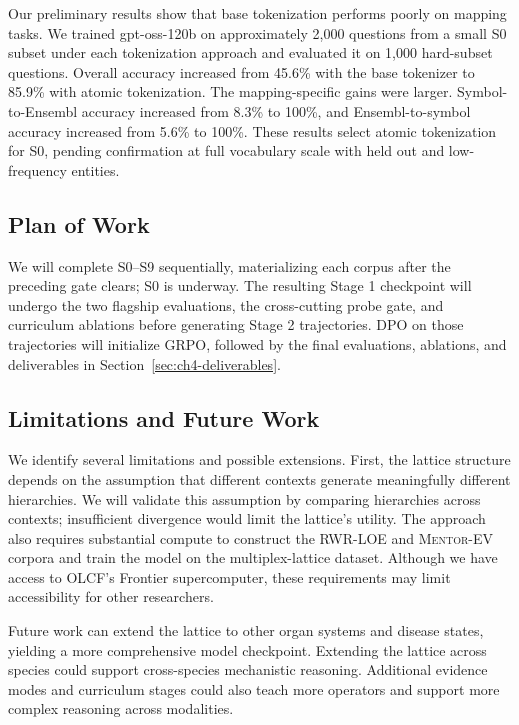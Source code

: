 Our preliminary results show that base tokenization performs poorly on mapping tasks. We trained gpt-oss-120b on approximately 2,000 questions from a small S0 subset under each tokenization approach and evaluated it on 1,000 hard-subset questions. Overall accuracy increased from 45.6\% with the base tokenizer to 85.9\% with atomic tokenization. The mapping-specific gains were larger. Symbol-to-Ensembl accuracy increased from 8.3\% to 100\%, and Ensembl-to-symbol accuracy increased from 5.6\% to 100\%. These results select atomic tokenization for S0, pending confirmation at full vocabulary scale with held out and low-frequency entities.

\subsection{Plan of Work}\label{sec:ch4-plan}
We will complete S0--S9 sequentially, materializing each corpus after the preceding gate clears; S0 is underway. The resulting Stage 1 checkpoint will undergo the two flagship evaluations, the cross-cutting probe gate, and curriculum ablations before generating Stage 2 trajectories. DPO on those trajectories will initialize GRPO, followed by the final evaluations, ablations, and deliverables in Section~\ref{sec:ch4-deliverables}.

\subsection{Limitations and Future Work}\label{sec:ch4-limits}
We identify several limitations and possible extensions. First, the lattice structure depends on the assumption that different contexts generate meaningfully different hierarchies. We will validate this assumption by comparing hierarchies across contexts; insufficient divergence would limit the lattice's utility. The approach also requires substantial compute to construct the RWR-LOE and \textsc{Mentor-EV} corpora and train the model on the multiplex-lattice dataset. Although we have access to OLCF's Frontier supercomputer, these requirements may limit accessibility for other researchers.

Future work can extend the lattice to other organ systems and disease states, yielding a more comprehensive model checkpoint. Extending the lattice across species could support cross-species mechanistic reasoning. Additional evidence modes and curriculum stages could also teach more operators and support more complex reasoning across modalities.
